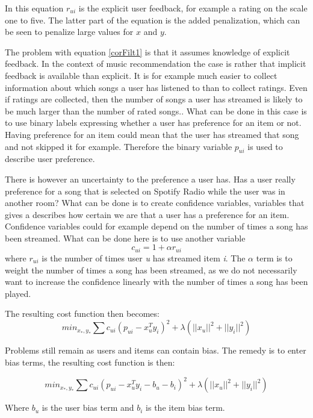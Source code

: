 \documentclass[a4paper,11pt]{kth-mag}
\begin{document}
In this equation $r_{ui}$ is the explicit user feedback, for example a rating on the scale one to five. The latter part of the equation is the added penalization, which can be seen to penalize large values for $x$ and $y$.

The problem with equation \ref{corFilt1} is that it assumes knowledge of explicit feedback. In the context of music recommendation the case is rather that implicit feedback is available than explicit. It is for example much easier to collect information about which songs a user has listened to than to collect ratings. Even if ratings are collected, then the number of songs a user has streamed is likely to be much larger than the number of rated songs.. What can be done in this case is to use binary labels expressing whether a user has preference for an item or not. Having preference for an item could mean that the user has streamed that song and not skipped it for example. Therefore the binary variable $p_{ui}$ is used to describe user preference.

There is however an uncertainty to the preference a user has. Has a user really preference for a song that is selected on Spotify Radio while the user was in another room? What can be done is to create confidence variables, variables that gives a describes how certain we are that a user has a preference for an item. Confidence variables could for example depend on the number of times a song has been streamed. What can be done here is to use another variable \[ c_{ui} = 1 + \alpha r_{ui} \] where $r_{ui}$ is the number of times user \textit{u} has streamed item \textit{i}. The $\alpha$ term is to weight the number of times a song has been streamed, as we do not necessarily want to increase the confidence linearly with the number of times a song has been played.

The resulting cost function then becomes:
\begin{equation}
min_{x_*,y_*} \sum c_{ui}(p_{ui} - x_u^Ty_i)^2 +  \lambda(||x_u||^2 + ||y_i||^2)
\end{equation}

Problems still remain as users and items can contain bias. The remedy is to enter bias terms, the resulting cost function is then:

\begin{equation}
min_{x_*,y_*} \sum c_{ui}(p_{ui} - x_u^Ty_i - b_u - b_i)^2 +  \lambda(||x_u||^2 + ||y_i||^2)
\end{equation}

Where $b_u$ is the user bias term and $b_i$ is the item bias term.
\end{document}

